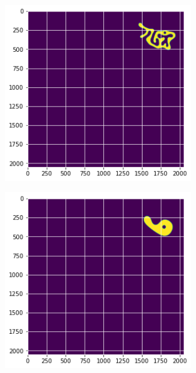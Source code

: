\documentclass[12pt, a4paper]{report}
\begin{document}
\begin{figure}[H]
\centering
\begin{subfigure}{.32\textwidth}
  \centering
  \includegraphics[width=0.9\textwidth]{Pictures/MSFeatures/ConvexMSStart.png}
  \label{img:microstrImg}
\end{subfigure}
\begin{subfigure}{.32\textwidth}
  \centering
  \includegraphics[width=0.9\textwidth]{Pictures/MSFeatures/ConvexMSMiddle.png}

\end{subfigure}
\end{figure}
\end{document}
